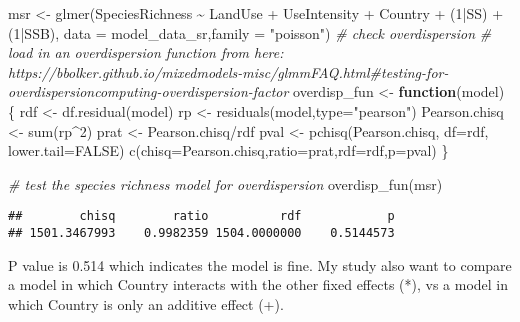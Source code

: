 \documentclass[
]{article}
\newenvironment{Shaded}{\begin{snugshade}}{\end{snugshade}}
\newcommand{\AttributeTok}[1]{\textcolor[rgb]{0.77,0.63,0.00}{#1}}
\newcommand{\CommentTok}[1]{\textcolor[rgb]{0.56,0.35,0.01}{\textit{#1}}}
\newcommand{\ConstantTok}[1]{\textcolor[rgb]{0.00,0.00,0.00}{#1}}
\newcommand{\ControlFlowTok}[1]{\textcolor[rgb]{0.13,0.29,0.53}{\textbf{#1}}}
\newcommand{\DecValTok}[1]{\textcolor[rgb]{0.00,0.00,0.81}{#1}}
\newcommand{\FunctionTok}[1]{\textcolor[rgb]{0.00,0.00,0.00}{#1}}
\newcommand{\NormalTok}[1]{#1}
\newcommand{\OtherTok}[1]{\textcolor[rgb]{0.56,0.35,0.01}{#1}}
\newcommand{\SpecialCharTok}[1]{\textcolor[rgb]{0.00,0.00,0.00}{#1}}
\newcommand{\StringTok}[1]{\textcolor[rgb]{0.31,0.60,0.02}{#1}}
\begin{document}
\begin{Shaded}
\begin{Highlighting}[]
\NormalTok{msr }\OtherTok{\textless{}{-}} \FunctionTok{glmer}\NormalTok{(SpeciesRichness }\SpecialCharTok{\textasciitilde{}}\NormalTok{ LandUse }\SpecialCharTok{+}\NormalTok{ UseIntensity }\SpecialCharTok{+}\NormalTok{ Country }\SpecialCharTok{+}\NormalTok{ (}\DecValTok{1}\SpecialCharTok{|}\NormalTok{SS) }\SpecialCharTok{+}\NormalTok{ (}\DecValTok{1}\SpecialCharTok{|}\NormalTok{SSB), }\AttributeTok{data =}\NormalTok{ model\_data\_sr,}\AttributeTok{family =} \StringTok{"poisson"}\NormalTok{)}
\CommentTok{\# check overdispersion}
\CommentTok{\# load in an overdispersion function from here: https://bbolker.github.io/mixedmodels{-}misc/glmmFAQ.html\#testing{-}for{-}overdispersioncomputing{-}overdispersion{-}factor}
\NormalTok{overdisp\_fun }\OtherTok{\textless{}{-}} \ControlFlowTok{function}\NormalTok{(model) \{}
\NormalTok{    rdf }\OtherTok{\textless{}{-}} \FunctionTok{df.residual}\NormalTok{(model)}
\NormalTok{    rp }\OtherTok{\textless{}{-}} \FunctionTok{residuals}\NormalTok{(model,}\AttributeTok{type=}\StringTok{"pearson"}\NormalTok{)}
\NormalTok{    Pearson.chisq }\OtherTok{\textless{}{-}} \FunctionTok{sum}\NormalTok{(rp}\SpecialCharTok{\^{}}\DecValTok{2}\NormalTok{)}
\NormalTok{    prat }\OtherTok{\textless{}{-}}\NormalTok{ Pearson.chisq}\SpecialCharTok{/}\NormalTok{rdf}
\NormalTok{    pval }\OtherTok{\textless{}{-}} \FunctionTok{pchisq}\NormalTok{(Pearson.chisq, }\AttributeTok{df=}\NormalTok{rdf, }\AttributeTok{lower.tail=}\ConstantTok{FALSE}\NormalTok{)}
    \FunctionTok{c}\NormalTok{(}\AttributeTok{chisq=}\NormalTok{Pearson.chisq,}\AttributeTok{ratio=}\NormalTok{prat,}\AttributeTok{rdf=}\NormalTok{rdf,}\AttributeTok{p=}\NormalTok{pval)}
\NormalTok{\}}

\CommentTok{\# test the species richness model for overdispersion}
\FunctionTok{overdisp\_fun}\NormalTok{(msr)}
\end{Highlighting}
\end{Shaded}

\begin{verbatim}
##        chisq        ratio          rdf            p 
## 1501.3467993    0.9982359 1504.0000000    0.5144573
\end{verbatim}

P value is 0.514 which indicates the model is fine. My study also want
to compare a model in which Country interacts with the other fixed
effects (*), vs a model in which Country is only an additive effect (+).
\end{document}

